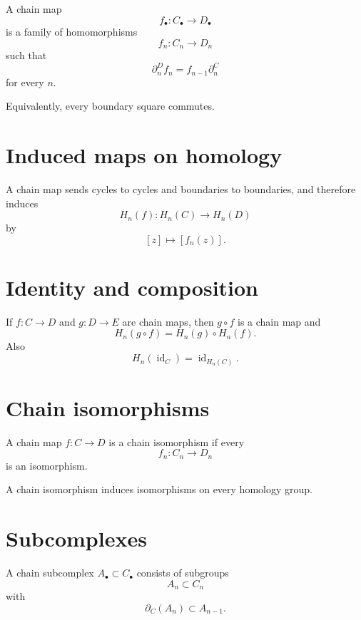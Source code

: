 \begin{definition}
\label{def:viii16-chain-map}
A chain map
\[
f_\bullet:C_\bullet\to D_\bullet
\]
is a family of homomorphisms
\[
f_n:C_n\to D_n
\]
such that
\[
\partial^D_n f_n
=
f_{n-1}\partial^C_n
\]
for every \(n\).
\end{definition}

Equivalently, every boundary square commutes.

\section{Induced maps on homology}

\begin{theorem}
\label{thm:viii16-induced}
A chain map sends cycles to cycles and boundaries to boundaries, and therefore
induces
\[
H_n(f):H_n(C)\to H_n(D)
\]
by
\[
[z]\longmapsto[f_n(z)].
\]
\end{theorem}

\section{Identity and composition}

If \(f:C\to D\) and \(g:D\to E\) are chain maps, then \(g\circ f\) is a chain
map and
\[
H_n(g\circ f)=H_n(g)\circ H_n(f).
\]
Also
\[
H_n(\operatorname{id}_C)=\operatorname{id}_{H_n(C)}.
\]

\section{Chain isomorphisms}

\begin{definition}
\label{def:viii16-chain-iso}
A chain map \(f:C\to D\) is a chain isomorphism if every
\[
f_n:C_n\to D_n
\]
is an isomorphism.
\end{definition}

A chain isomorphism induces isomorphisms on every homology group.

\section{Subcomplexes}

\begin{definition}
\label{def:viii16-subcomplex}
A chain subcomplex \(A_\bullet\subset C_\bullet\) consists of subgroups
\[
A_n\subset C_n
\]
with
\[
\partial_C(A_n)\subset A_{n-1}.
\]
\end{definition}


